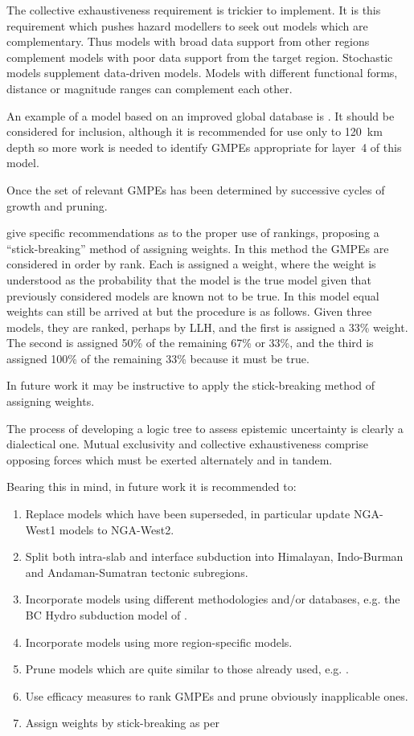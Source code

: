 \documentclass{article}
\begin{document}
\begin{appendices}
The collective exhaustiveness requirement is trickier to implement.
It is this requirement which pushes hazard modellers to seek out models which are complementary.
Thus models with broad data support from other regions complement models with poor data support from the target region.
Stochastic models supplement data-driven models.
Models with different functional forms, distance or magnitude ranges can complement each other.

An example of a model based on an improved global database is \cite{abrahamson2016bc}.
It should be considered for inclusion, although it is recommended for use only to 120~km depth so more work is needed to identify GMPEs appropriate for layer~4 of this model.

Once the set of relevant GMPEs has been determined by successive cycles of growth and pruning.

\cite{scherbaum2011logic} give specific recommendations as to the proper use of rankings, proposing a ``stick-breaking'' method of assigning weights.
In this method the GMPEs are considered in order by rank.  Each is assigned a weight, where the weight is understood as the probability that the model is the true model given that previously considered models are known not to be true.
In this model equal weights can still be arrived at but the procedure is as follows. 
Given three models, they are ranked, perhaps by LLH, and the first is assigned a 33\% weight. 
The second is assigned 50\% of the remaining 67\% or 33\%, and the third is assigned 100\% of the remaining 33\% because it must be true.

In future work it may be instructive to apply the stick-breaking method of assigning weights.

The process of developing a logic tree to assess epistemic uncertainty is clearly a dialectical one.
Mutual exclusivity and collective exhaustiveness comprise opposing forces which must be exerted alternately and in tandem.

Bearing this in mind, in future work it is recommended to:
\begin{enumerate}
\item Replace models which have been superseded, in particular update NGA-West1 models to NGA-West2.
\item Split both intra-slab and interface subduction into Himalayan, Indo-Burman and Andaman-Sumatran tectonic subregions.
\item Incorporate models using different methodologies and/or databases, e.g. the BC Hydro subduction model of \cite{abrahamson2016bc}.
\item Incorporate models using more region-specific models.
\item Prune models which are quite similar to those already used, e.g. \cite{toro2002modification}.
\item Use efficacy measures to rank GMPEs and prune obviously inapplicable ones.
\item Assign weights by stick-breaking as per \cite{scherbaum2011logic}
\end{enumerate}


\end{appendices}
\end{document}
